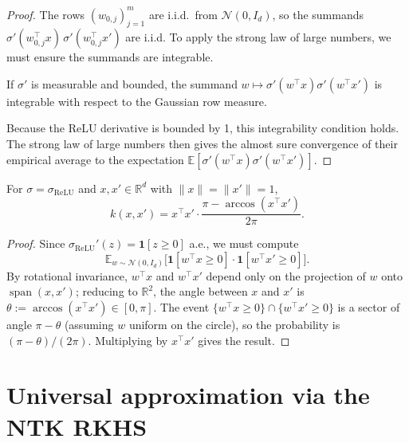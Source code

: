 \begin{proof}
  \leanok
The rows $(w_{0,j})_{j=1}^m$ are i.i.d.\ from $\mathcal{N}(0, I_d)$, so the summands
$\sigma'(w_{0,j}^\top x)\,\sigma'(w_{0,j}^\top x')$ are i.i.d. To apply the strong law of large numbers, we must ensure the summands are integrable.
\begin{lemma}\label{lem:ntk:integrableSummand}
  \leanok
If $\sigma'$ is measurable and bounded, the summand $w \mapsto \sigma'(w^\top x)\sigma'(w^\top x')$ is integrable with respect to the Gaussian row measure.
\end{lemma}
Because the ReLU derivative is bounded by 1, this integrability condition holds. 
The strong law of large numbers then gives the almost sure convergence of their empirical
average to the expectation $\mathbb{E}[\sigma'(w^\top x)\sigma'(w^\top x')]$.
\end{proof}

\begin{proposition}\label{prop:ntk:reluNTK}
  \leanok
For $\sigma = \sigma_{\mathrm{ReLU}}$ and $x, x' \in \mathbb{R}^d$ with $\|x\| = \|x'\| = 1$,
\[
  k(x, x') = x^\top x' \cdot \frac{\pi - \arccos(x^\top x')}{2\pi}.
\]
\end{proposition}

\begin{proof}
  \leanok
Since $\sigma_{\mathrm{ReLU}}'(z) = \mathbf{1}[z \ge 0]$ a.e., we must compute
\[
  \mathbb{E}_{w \sim \mathcal{N}(0,I_d)}\!
    \bigl[\mathbf{1}[w^\top x \ge 0] \cdot \mathbf{1}[w^\top x' \ge 0]\bigr].
\]
By rotational invariance, $w^\top x$ and $w^\top x'$ depend only on the projection
of $w$ onto $\operatorname{span}(x, x')$; reducing to $\mathbb{R}^2$, the angle between
$x$ and $x'$ is $\theta := \arccos(x^\top x') \in [0,\pi]$.
The event $\{w^\top x \ge 0\} \cap \{w^\top x' \ge 0\}$ is a sector of angle $\pi - \theta$
(assuming $w$ uniform on the circle), so the probability is $(\pi - \theta)/(2\pi)$.
Multiplying by $x^\top x'$ gives the result.
\end{proof}


\section{Universal approximation via the NTK RKHS}\label{sec:ntk:universal}

